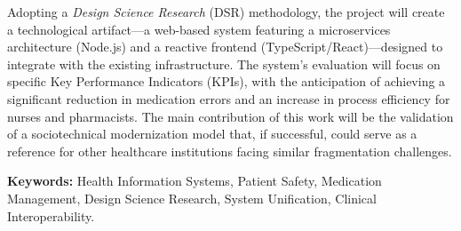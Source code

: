Adopting a \textit{Design Science Research} (DSR) methodology, the project will create a technological artifact---a web-based system featuring a microservices architecture (Node.js) and a reactive frontend (TypeScript/React)---designed to integrate with the existing infrastructure. The system's evaluation will focus on specific Key Performance Indicators (KPIs), with the anticipation of achieving a significant reduction in medication errors and an increase in process efficiency for nurses and pharmacists. The main contribution of this work will be the validation of a sociotechnical modernization model that, if successful, could serve as a reference for other healthcare institutions facing similar fragmentation challenges.

\vspace{6mm}
\noindent\textbf{Keywords:} Health Information Systems, Patient Safety, Medication Management, Design Science Research, System Unification, Clinical Interoperability. 